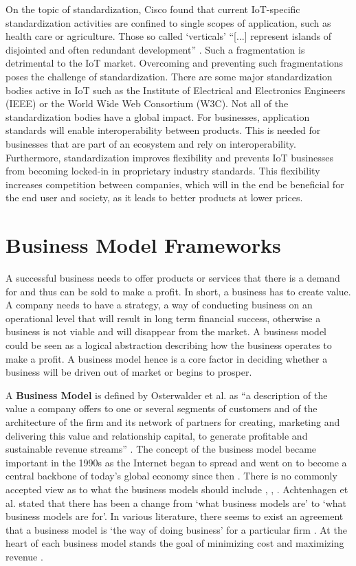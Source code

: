 		On the topic of standardization, Cisco found that current IoT-specific standardization activities are confined to single scopes of application, such as health care or agriculture. Those so called `verticals' ``[...] represent islands of disjointed and often redundant development'' \cite{cisco}. Such a fragmentation is detrimental to the IoT market. Overcoming and preventing such fragmentations poses the challenge of standardization. There are some major standardization bodies active in IoT such as the Institute of Electrical and Electronics Engineers (IEEE) or the World Wide Web Consortium (W3C). Not all of the standardization bodies have a global impact. For businesses, application standards will enable interoperability between products. This is needed for businesses that are part of an ecosystem and rely on interoperability. Furthermore, standardization improves flexibility and prevents IoT businesses from becoming locked-in in proprietary industry standards. This flexibility increases competition between companies, which will in the end be beneficial for the end user and society, as it leads to better products at lower prices.
%
\vspace{-1em}
\section{Business Model Frameworks}
\label{sec:bmf}	
\vspace{-1.5em}
	A successful business needs to offer products or services that there is a demand for and thus can be sold to make a profit. In short, a business has to create value. A company needs to have a strategy, a way of conducting business on an operational level that will result in long term financial success, otherwise a business is not viable and will disappear from the market. A business model could be seen as a logical abstraction describing how the business operates to make a profit. A business model hence is a core factor in deciding whether a business will be driven out of market or begins to prosper.
	
	A \textbf{Business Model} is defined by Osterwalder et al. as ``a description of the value a company offers to one or several segments of customers and of the architecture of the firm and its network of partners for creating, marketing and delivering this value and relationship capital, to generate profitable and sustainable revenue streams'' \cite{osterwalder2005}. The concept of the business model became important in the 1990s as the Internet began to spread and went on to become a central backbone of today's global economy since then \cite{zott}. There is no commonly accepted view as to what the business models should include \cite{morris}, \cite{osterwalder2005}, \cite{schweizer}. Achtenhagen et al. \cite{achtenhagen} stated that there has been a change from `what business models are' to `what business models are for'. In various literature, there seems to exist an agreement that a business model is `the way of doing business' for a particular firm \cite{westerlund}. At the heart of each business model stands the goal of minimizing cost and maximizing revenue \cite{ju}.\\
	
